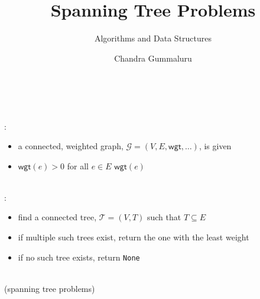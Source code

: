 \documentclass[mathserif, handout]{beamer}
\title{Spanning Tree Problems}
\subtitle{Algorithms and Data Structures}
\author[C. Gummaluru]{Chandra Gummaluru}
\institute[]{\url{chandra-gummaluru.github.io} }
\date[Algorithms and Data Structures]{}
\begin{document}
\begin{frame}
  \maketitle
\end{frame}

\begin{frame}
  \begin{thmbox}
     \\
     \\[2mm]
    :
    \begin{itemize}
      \item a connected, weighted graph, $\mathcal{G} = (V,E, \textsf{wgt},\dots)$, is given
      \item $\textsf{wgt}(e) > 0$ for all $e \in E$ $\textsf{wgt}(e)$
    \end{itemize}
    \\[4mm]
    :
    \begin{itemize}
      \item find a connected tree, $\mathcal{T} = (V,T)$ such that $T \subseteq E$
      \item if multiple such trees exist, return the one with the least weight
      \item if no such tree exists, return \texttt{None}
    \end{itemize}
  \end{thmbox}
\end{frame}

\begin{frame}
  \begin{center}
    \Large {} \\[1mm]
    \normalsize \color{gray} (spanning tree problems)
  \end{center}
\end{frame}
\end{document}
